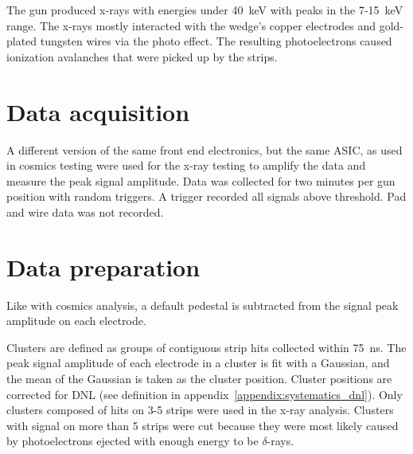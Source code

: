 The gun produced x-rays with energies under \SI{40}{\kilo\electronvolt} with peaks in the 7-\SI{15}{keV} range. The x-rays mostly interacted with the wedge's copper electrodes and gold-plated tungsten wires via the photo effect. The resulting photoelectrons caused ionization avalanches that were picked up by the strips.

\section{Data acquisition}

A different version of the same front end electronics, but the same ASIC, as used in cosmics testing were used for the x-ray testing to amplify the data and measure the peak signal amplitude. Data was collected for two minutes per gun position with random triggers. A trigger recorded all signals above threshold. Pad and wire data was not recorded.

\section{Data preparation}

Like with cosmics analysis, a default pedestal is subtracted from the signal peak amplitude on each electrode.

Clusters are defined as groups of contiguous strip hits collected within \SI{75}{ns}. The peak signal amplitude of each electrode in a cluster is fit with a Gaussian, and the mean of the Gaussian is taken as the cluster position. Cluster positions are corrected for DNL (see definition in appendix~\ref{appendix:systematics_dnl}). Only clusters composed of hits on 3-5 strips were used in the x-ray analysis. Clusters with signal on more than 5 strips were cut because they were most likely caused by photoelectrons ejected with enough energy to  be $\delta$-rays.

